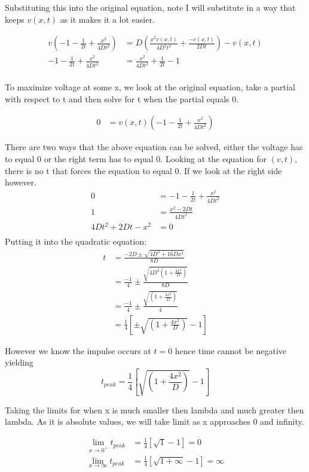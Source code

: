 \documentclass{article}
\begin{document}
Substituting this into the original equation, note I will substitute in a way that keeps $v(x,t)$
as it makes it a lot easier.

\begin{align}
    v\left(-1 - \frac{1}{2 t} + \frac{x^2}{4Dt^2}\right) &= D\left(\frac{x^2v(x,t)}{4D^2t^2} + \frac{-v(x,t)}{2Dt}\right) - v(x,t)\\
    -1 - \frac{1}{2t} + \frac{x^2}{4Dt^2} &= \frac{x^2}{4Dt^2} + \frac{1}{2t} - 1\\
\end{align}

To maximize voltage at some x, we look at the original equation, take a partial with respect
to t and then solve for t when the partial equals 0.

\begin{align}
    0 &= v(x,t)\left(-1 - \frac{1}{2t} + \frac{x^2}{4Dt^2}\right)
\end{align}

There are two ways that the above equation can be solved, either the voltage has to equal 0 or the
right term has to equal 0. Looking at the equation for $(v,t)$, there is no t that forces the equation to equal 0.
If we look at the right side however.
\begin{align}
    0 &= -1 - \frac{1}{2t} + \frac{x^2}{4Dt^2}\\
    1 &= \frac{x^2-2Dt}{4Dt^2}\\
    4Dt^2 + 2Dt - x^2 &= 0\\
\end{align}
Putting it into the quadratic equation:
\begin{align}
    t &= \frac{-2D \pm \sqrt{4D^2 + 16Dx^2}}{8D}\\
&=\frac{-1}{4} \pm \frac{\sqrt{4D^2(1+\frac{4x^2}{D})}}{8D}\\
&=\frac{-1}{4} \pm \frac{\sqrt{(1+\frac{4x^2}{D})}}{4}\\
&= \frac{1}{4}\left[\pm \sqrt{(1+\frac{4x^2}{D})}-1\right]
\end{align}

However we know the impulse occurs at $t=0$ hence time cannot be negative yielding
\[
t_{peak} = \frac{1}{4}\left[\sqrt{(1+\frac{4x^2}{D})}-1\right]
\]

Taking the limits for when x is much smaller then lambda and much greater then lambda.
As it is absolute values, we will take limit as x approaches 0 and infinity.

\begin{align}
    \lim_{x\to 0^+} t_{peak} &= \frac{1}{4}\left[\sqrt{1}-1\right] = 0\\
    \lim_{x\to \infty} t_{peak} &= \frac{1}{4}\left[\sqrt{1 + \infty}-1\right] = \infty
\end{align}
\end{document}
